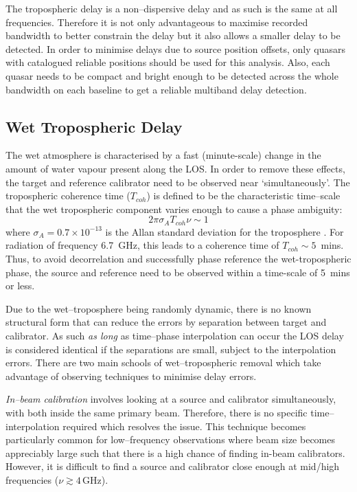  		The tropospheric delay is a non--dispersive delay and as such is the same at all frequencies. Therefore it is not only advantageous to maximise recorded bandwidth to better constrain the delay but it also allows a smaller delay to be detected. In order to minimise delays due to source position offsets, only quasars with catalogued reliable positions should be used for this analysis. Also, each quasar needs to be compact and bright enough to be detected across the whole bandwidth on each baseline to get a reliable multiband delay detection.
		
	\subsection{Wet Tropospheric Delay} \label{sec:wetdelay}
		The wet atmosphere is characterised by a fast (minute-scale) change in the amount of water vapour present along the LOS. In order to remove these effects, the target and reference calibrator need to be observed near `simultaneously'. The tropospheric coherence time ($T_{coh}$) is defined to be the characteristic time--scale that the wet tropospheric component varies enough to cause a phase ambiguity: 
		\begin{equation}
			2\pi \sigma_A T_{coh}\nu\sim1
			\label{eq:wettropocoherence}
		\end{equation} where $\sigma_A=0.7\times10^{-13}$ is the Allan standard deviation for the troposphere \citep{ReidHonma2014}. For radiation of frequency 6.7~GHz, this leads to a coherence time of $T_{coh}\sim5$~mins. Thus, to avoid decorrelation and successfully phase reference the wet-tropospheric phase, the source and reference need to be observed within a time-scale of 5~mins or less.
		
		Due to the wet--troposphere being randomly dynamic, there is no known structural form that can reduce the errors by separation between target and calibrator. As such {\it as long} as time--phase interpolation can occur the LOS delay is considered identical if the separations are small, subject to the interpolation errors. There are two main schools of wet--tropospheric removal which take advantage of observing techniques to minimise delay errors.
		
		\textit{In--beam calibration} involves looking at a source and calibrator simultaneously, with both inside the same primary beam. Therefore, there is no specific time--interpolation required which resolves the issue. This technique becomes particularly common for low--frequency observations where beam size becomes appreciably large such that there is a high chance of finding in-beam calibrators. However, it is difficult to find a source and calibrator close enough at mid/high frequencies ($\nu\gtrsim4$\,GHz).
		
